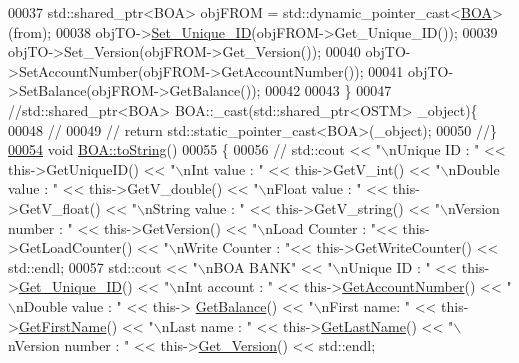 \begin{DoxyCode}
00037     std::shared\_ptr<BOA> objFROM = std::dynamic\_pointer\_cast<\hyperlink{class_b_o_a}{BOA}>(from);
00038     objTO->\hyperlink{class_o_s_t_m_ab5019a32185631c08abbf826422f2d93_ab5019a32185631c08abbf826422f2d93}{Set\_Unique\_ID}(objFROM->Get\_Unique\_ID());
00039     objTO->Set\_Version(objFROM->Get\_Version());
00040     objTO->SetAccountNumber(objFROM->GetAccountNumber());
00041     objTO->SetBalance(objFROM->GetBalance());
00042         
00043 \}
00047 \textcolor{comment}{//std::shared\_ptr<BOA> BOA::\_cast(std::shared\_ptr<OSTM> \_object)\{}
00048 \textcolor{comment}{//}
00049 \textcolor{comment}{//    return std::static\_pointer\_cast<BOA>(\_object);}
00050 \textcolor{comment}{//\}}
\hypertarget{_b_o_a_8cpp_source.tex_l00054}{}\hyperlink{class_b_o_a_a348df0299997f81bcad0ec034dab0b8d_a348df0299997f81bcad0ec034dab0b8d}{00054} \textcolor{comment}{}\textcolor{keywordtype}{void} \hyperlink{class_b_o_a_a348df0299997f81bcad0ec034dab0b8d_a348df0299997f81bcad0ec034dab0b8d}{BOA::toString}()
00055 \{
00056    \textcolor{comment}{// std::cout << "\(\backslash\)nUnique ID : " << this->GetUniqueID() << "\(\backslash\)nInt value : " << this->GetV\_int() <<
       "\(\backslash\)nDouble value : " << this->GetV\_double() << "\(\backslash\)nFloat value : " << this->GetV\_float() << "\(\backslash\)nString value : " <<
       this->GetV\_string()  << "\(\backslash\)nVersion number : " << this->GetVersion() << "\(\backslash\)nLoad Counter : "<<
       this->GetLoadCounter() << "\(\backslash\)nWrite Counter : "<< this->GetWriteCounter() << std::endl;}
00057      std::cout << \textcolor{stringliteral}{"\(\backslash\)nBOA BANK"} << \textcolor{stringliteral}{"\(\backslash\)nUnique ID : "} << this->\hyperlink{class_o_s_t_m_a5a01a8b98d16b1d1904ecf9356e7b71d_a5a01a8b98d16b1d1904ecf9356e7b71d}{Get\_Unique\_ID}() << \textcolor{stringliteral}{"\(\backslash\)nInt account
       : "} << this->\hyperlink{class_b_o_a_ad64bd63675f8902153aa6767994f05dc_ad64bd63675f8902153aa6767994f05dc}{GetAccountNumber}() << \textcolor{stringliteral}{"\(\backslash\)nDouble value : "} << this->
      \hyperlink{class_b_o_a_a07e30b7e5f5f20392b94af7344fd550c_a07e30b7e5f5f20392b94af7344fd550c}{GetBalance}() << \textcolor{stringliteral}{"\(\backslash\)nFirst name: "} << this->\hyperlink{class_b_o_a_ae6bb3df4e1fb210610325ffd1985c7c0_ae6bb3df4e1fb210610325ffd1985c7c0}{GetFirstName}() << \textcolor{stringliteral}{"\(\backslash\)nLast name : "} << 
      this->\hyperlink{class_b_o_a_a081383edefc1f66b80c3fb8862ab070b_a081383edefc1f66b80c3fb8862ab070b}{GetLastName}()  << \textcolor{stringliteral}{"\(\backslash\)nVersion number : "} << this->\hyperlink{class_o_s_t_m_a1f1db9d482f22c8e7caa17dfb340626b_a1f1db9d482f22c8e7caa17dfb340626b}{Get\_Version}() << std::endl;

\end{DoxyCode}
